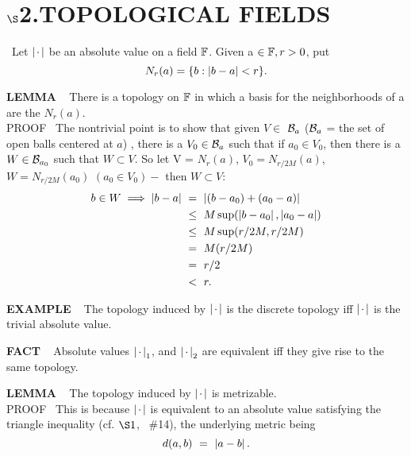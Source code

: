 \chapter{
$\boldsymbol{\S}$\textbf{2}.\quad  TOPOLOGICAL FIELDS}
\setlength\parindent{2em}
\setcounter{theoremn}{0}


\ \indent Let $\left\vert\hspace{0.05cm}\cdot \hspace{0.05cm}\right\vert$ be an absolute value on a field $\mathbb{F}$. Given a $\in \mathbb{F}, r > 0$, put
\[
N_r(a) = \{b: \left\vert b - a\right\vert < r\}.
\]


\begin{x}{\small\bf LEMMA} \ %
There is a topology on $\mathbb{F}$ in which a basis for the neighborhoods of a are the $N_r(a)$.\\

PROOF \  The nontrivial point is to show that given  $V \in$ $\mathcal{B}_a$
($\mathcal{B}_a$ = the set of open balls centered at $a$)\xspace
, 
there is a $V_0 \in \mathcal{B}_a$ such that if $a_0 \in V_0$, then there is a $W \in \mathcal{B}_{a_0}$ such that $W \subset V$.  
So let V = $N_r(a)$, $V_0 = N_{r/2M}(a)$, $W = N_{r/2M}(a_0)$ $(a_0 \in V_0) -$ then $W \subset V:$
\[
\begin{aligned}
b \in W \implies \abs{b - a} \ 
&= \ \abs{(b - a_0) + (a_0 - a)}\\
&\le \ M \sup(\abs{b - a_0}, \abs{a_0 - a}) \\
&\le \ M \sup(r/2M, r/2M)\\
&= \  M(r/2M) \\
&= \ r/2 \\
&< \  r.
\end{aligned}
\]
\end{x}



\begin{x}{\small\bf EXAMPLE} \ %
The topology induced by $\left\vert\hspace{0.05cm} \cdot \hspace{0.05cm}\right\vert$ is the discrete topology iff  $\left\vert\hspace{0.05cm} \cdot \hspace{0.05cm}\right\vert$ is the trivial absolute value.
\end{x}


\begin{x}{\small\bf FACT} \ %
Absolute values $\left\vert\hspace{0.05cm} \cdot \hspace{0.05cm}\right\vert_1$, and $\left\vert\hspace{0.05cm} \cdot \hspace{0.05cm}\right\vert_2$ are equivalent iff they give rise to the same topology.
\end{x}

\begin{x}{\small\bf LEMMA} \ %
The topology induced by $\left\vert\hspace{0.05cm} \cdot \hspace{0.05cm}\right\vert$  is metrizable.\\

PROOF \  This is because $\left\vert\hspace{0.05cm} \cdot \hspace{0.05cm}\right\vert$ is equivalent to an absolute value satisfying the 
triangle inequality (cf. $\S1$, \ \#14), the underlying metric being 
\[
d(a,b) \ = \  \left\vert a - b\right\vert.
\]
\end{x}

